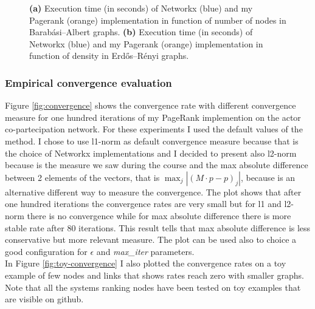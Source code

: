 \documentclass{article}
\begin{document}
\begin{figure}
\begin{subfigure}{0.45\textwidth}
         \subcaption[]{}
         \label{fig:times_for_density}
     \end{subfigure}
     \hfill
    \caption{\textbf{(a)} Execution time (in seconds) of Networkx (blue) and my Pagerank (orange) implementation in function of number of nodes in Barabási–Albert graphs. \textbf{(b)} Execution time (in seconds) of Networkx (blue) and my Pagerank (orange) implementation in function of density in Erdős–Rényi graphs.}
    \label{fig:performance}
\end{figure}

\subsubsection{Empirical convergence evaluation}
Figure \ref{fig:convergence} shows the convergence rate with different convergence measure for one hundred iterations of my PageRank implemention on the actor co-partecipation network. For these experiments I used the default values of the method. 
I chose to use l1-norm as default convergence measure because that is the choice of Networkx implementations and I decided to present also l2-norm because is the measure we saw during the course and the max absolute difference between 2 elements of the vectors, that is $\max_{j} |(M\cdot p - p)_{j}|$, because is an alternative different way to measure the convergence. The plot shows that after one hundred iterations the convergence rates are very small but for l1 and l2-norm there is no convergence while for max absolute difference there is more stable rate after 80 iterations. This result tells that max absolute difference is less conservative but more relevant measure. The plot can be used also to choice a good configuration for $\epsilon$ and \textit{max\_iter} parameters. \\ In Figure \ref{fig:toy-convergence} I also plotted the convergence rates on a toy example of few nodes and links that shows rates reach zero with smaller graphs. Note that all the systems ranking nodes have been tested on toy examples that are visible on github.
\end{document}
